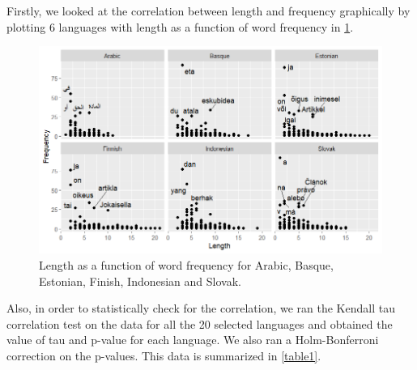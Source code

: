 Firstly, we looked at the correlation between length and frequency graphically by plotting 6 languages with length as a function of word frequency in \cref{plot1}.

\begin{figure}[h]
\centering
\includegraphics[width=\textwidth]{images/plot1.png}
\caption{Length as a function of word frequency for Arabic, Basque, Estonian, Finish, Indonesian and Slovak.}
\label{plot1}
\end{figure}

\newpage
Also, in order to statistically check for the correlation, we ran the  Kendall tau correlation test on the data for all the 20 selected languages and obtained the value of tau and p-value for each language. We also ran a Holm-Bonferroni correction on the p-values. This data is summarized in \cref{table1}.

